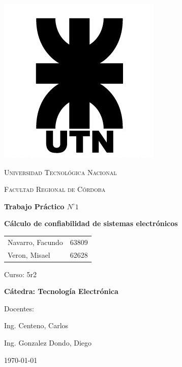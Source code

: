 \documentclass{article}
\begin{document}
\begin{titlepage}
 \centering
	\includegraphics[scale=0.80]{imagenes/LOGO.jpg} \par
 	\vspace{1cm}
 	{\scshape\LARGE Universidad Tecnológica Nacional \par}
 	{\scshape\large Facultad Regional de Córdoba \par}
 	\vspace{1cm}
	{\bfseries \Large Trabajo Práctico $N^{\circ} 1$\par}
	{\bfseries \Large Cálculo de confiabilidad de sistemas electrónicos \par}
 	\vspace{1.5cm}

	\begin{tabular}{ll}
		Navarro, Facundo 	&	63809 	\\
		Veron, Misael	 	&	62628
	\end{tabular}
	
	\vspace{1cm}
	Curso: 5r2 \\
 	\vfill
	{\bfseries \Large Cátedra: Tecnología Electrónica \par}

	\vspace{1.5cm}
	Docentes: \par
	Ing. Centeno, Carlos \par
	Ing. Gonzalez Dondo, Diego \par

 	\vfill
	{\large \today\par}
\end{titlepage}

\end{document}
